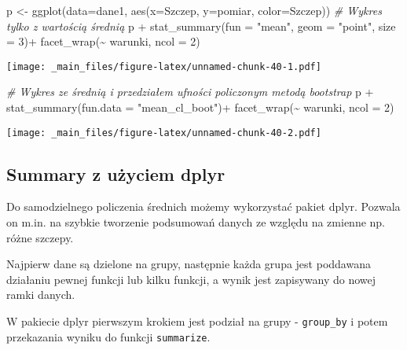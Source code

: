 \documentclass[
]{book}
\newenvironment{Shaded}{\begin{snugshade}}{\end{snugshade}}
\newcommand{\AttributeTok}[1]{\textcolor[rgb]{0.77,0.63,0.00}{#1}}
\newcommand{\CommentTok}[1]{\textcolor[rgb]{0.56,0.35,0.01}{\textit{#1}}}
\newcommand{\DecValTok}[1]{\textcolor[rgb]{0.00,0.00,0.81}{#1}}
\newcommand{\FunctionTok}[1]{\textcolor[rgb]{0.00,0.00,0.00}{#1}}
\newcommand{\NormalTok}[1]{#1}
\newcommand{\OtherTok}[1]{\textcolor[rgb]{0.56,0.35,0.01}{#1}}
\newcommand{\SpecialCharTok}[1]{\textcolor[rgb]{0.00,0.00,0.00}{#1}}
\newcommand{\StringTok}[1]{\textcolor[rgb]{0.31,0.60,0.02}{#1}}
\begin{document}
\begin{Shaded}
\begin{Highlighting}[]
\NormalTok{p }\OtherTok{\textless{}{-}} \FunctionTok{ggplot}\NormalTok{(}\AttributeTok{data=}\NormalTok{dane1, }\FunctionTok{aes}\NormalTok{(}\AttributeTok{x=}\NormalTok{Szczep, }\AttributeTok{y=}\NormalTok{pomiar, }\AttributeTok{color=}\NormalTok{Szczep))}
\CommentTok{\# Wykres tylko z wartością średnią}
\NormalTok{p }\SpecialCharTok{+} \FunctionTok{stat\_summary}\NormalTok{(}\AttributeTok{fun =} \StringTok{"mean"}\NormalTok{, }\AttributeTok{geom =} \StringTok{"point"}\NormalTok{, }\AttributeTok{size =} \DecValTok{3}\NormalTok{)}\SpecialCharTok{+}
  \FunctionTok{facet\_wrap}\NormalTok{(}\SpecialCharTok{\textasciitilde{}}\NormalTok{ warunki, }\AttributeTok{ncol =} \DecValTok{2}\NormalTok{)}
\end{Highlighting}
\end{Shaded}

\texttt{[image: \_main\_files/figure-latex/unnamed-chunk-40-1.pdf]}

\begin{Shaded}
\begin{Highlighting}[]
\CommentTok{\# Wykres ze średnią i przedziałem ufności policzonym metodą bootstrap}
\NormalTok{p }\SpecialCharTok{+} \FunctionTok{stat\_summary}\NormalTok{(}\AttributeTok{fun.data =} \StringTok{"mean\_cl\_boot"}\NormalTok{)}\SpecialCharTok{+}
  \FunctionTok{facet\_wrap}\NormalTok{(}\SpecialCharTok{\textasciitilde{}}\NormalTok{ warunki, }\AttributeTok{ncol =} \DecValTok{2}\NormalTok{)}
\end{Highlighting}
\end{Shaded}

\texttt{[image: \_main\_files/figure-latex/unnamed-chunk-40-2.pdf]}

\hypertarget{summary-z-uux17cyciem-dplyr}{%
\subsection{Summary z użyciem dplyr}\label{summary-z-uux17cyciem-dplyr}}

Do samodzielnego policzenia średnich możemy wykorzystać pakiet dplyr. Pozwala on m.in. na szybkie tworzenie podsumowań danych ze względu na zmienne np. różne szczepy.

Najpierw dane są dzielone na grupy, następnie każda grupa jest poddawana działaniu pewnej funkcji lub kilku funkcji, a wynik jest zapisywany do nowej ramki danych.

W pakiecie dplyr pierwszym krokiem jest podział na grupy - \texttt{group\_by} i potem przekazania wyniku do funkcji \texttt{summarize}.
\end{document}
